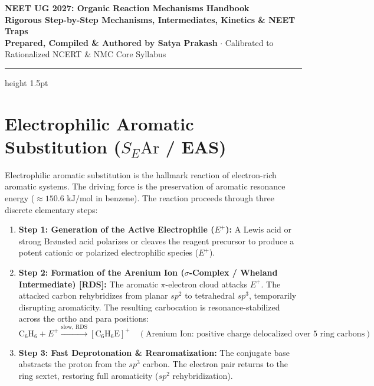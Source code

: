 \documentclass[10pt,a4paper]{article}
\begin{document}
\thispagestyle{plain}

\begin{center}
  {\Huge \textbf{NEET UG 2027: Organic Reaction Mechanisms Handbook}}\\[6pt]
  {\Large \textbf{Rigorous Step-by-Step Mechanisms, Intermediates, Kinetics \& NEET Traps}}\\[4pt]
  {\small \textbf{Prepared, Compiled \& Authored by Satya Prakash} $\cdot$ Calibrated to Rationalized NCERT \& NMC Core Syllabus}
  \vspace{4pt}
  \hrule height 1.5pt
\end{center}

\section{Electrophilic Aromatic Substitution (\texorpdfstring{$S_E\mathrm{Ar}$}{SEAr} / EAS)}

\begin{conceptbox}
Electrophilic aromatic substitution is the hallmark reaction of electron-rich aromatic systems. The driving force is the preservation of aromatic resonance energy ($\approx 150.6\text{ kJ/mol}$ in benzene). The reaction proceeds through three discrete elementary steps:
\begin{enumerate}[leftmargin=*]
  \item \textbf{Step 1: Generation of the Active Electrophile ($E^+$):} A Lewis acid or strong Br{\o}nsted acid polarizes or cleaves the reagent precursor to produce a potent cationic or polarized electrophilic species ($E^+$).
  \item \textbf{Step 2: Formation of the Arenium Ion ($\sigma$-Complex / Wheland Intermediate) [RDS]:} The aromatic $\pi$-electron cloud attacks $E^+$. The attacked carbon rehybridizes from planar $sp^2$ to tetrahedral $sp^3$, temporarily disrupting aromaticity. The resulting carbocation is resonance-stabilized across the ortho and para positions:
  \begin{equation}
    \mathrm{C_6H_6} + E^+ \xrightarrow{\text{slow, RDS}} [\mathrm{C_6H_6E}]^+ \quad (\text{Arenium Ion: positive charge delocalized over 5 ring carbons})
  \end{equation}
  \item \textbf{Step 3: Fast Deprotonation \& Rearomatization:} The conjugate base abstracts the proton from the $sp^3$ carbon. The electron pair returns to the ring sextet, restoring full aromaticity ($sp^2$ rehybridization).
\end{enumerate}
\end{conceptbox}
\end{document}
